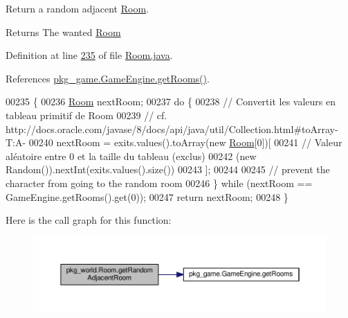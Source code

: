 Return a random adjacent \hyperlink{classpkg__world_1_1Room}{Room}. 

\begin{DoxyReturn}{Returns}
The wanted \hyperlink{classpkg__world_1_1Room}{Room} 
\end{DoxyReturn}


Definition at line \hyperlink{Room_8java_source_l00235}{235} of file \hyperlink{Room_8java_source}{Room.\-java}.



References \hyperlink{GameEngine_8java_source_l00306}{pkg\-\_\-game.\-Game\-Engine.\-get\-Rooms()}.


\begin{DoxyCode}
00235                                         \{
00236         \hyperlink{classpkg__world_1_1Room_ae48ca6830c8c9368ab1cb7e9b006d157}{Room} nextRoom;
00237         \textcolor{keywordflow}{do} \{
00238             \textcolor{comment}{// Convertit les valeurs en tableau primitif de Room}
00239             \textcolor{comment}{// cf. http://docs.oracle.com/javase/8/docs/api/java/util/Collection.html#toArray-T:A-}
00240             nextRoom = exits.values().toArray(\textcolor{keyword}{new} \hyperlink{classpkg__world_1_1Room_ae48ca6830c8c9368ab1cb7e9b006d157}{Room}[0])[
00241                 \textcolor{comment}{// Valeur aléatoire entre 0 et la taille du tableau (exclus)}
00242                 (\textcolor{keyword}{new} Random()).nextInt(exits.values().size())
00243                 ];
00244 
00245             \textcolor{comment}{// prevent the character from going to the random room}
00246         \} \textcolor{keywordflow}{while} (nextRoom == GameEngine.getRooms().get(0));
00247         \textcolor{keywordflow}{return} nextRoom;
00248     \}
\end{DoxyCode}


Here is the call graph for this function\-:
\nopagebreak
\begin{figure}[H]
\begin{center}
\leavevmode
\includegraphics[width=350pt]{classpkg__world_1_1Room_a00952ff3743ec6cd8d238dada7506f63_cgraph}
\end{center}
\end{figure}


